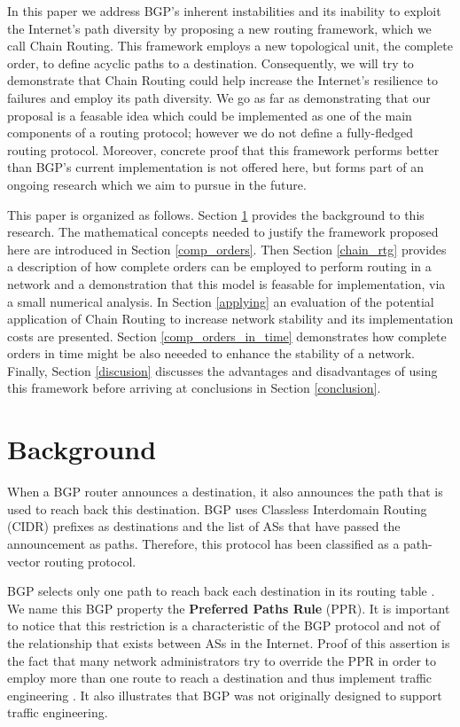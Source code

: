 \documentclass[5p,twocolumn]{elsarticle}
\begin{document}
In this paper we address BGP's inherent instabilities and its inability to exploit the Internet's path diversity by proposing a new routing framework, which we call Chain Routing. This framework employs a new topological unit, the complete order, to define acyclic paths to a destination. Consequently, we will try to demonstrate that Chain Routing could help increase the Internet's resilience to failures and employ its path diversity. We go as far as demonstrating that our proposal is a feasable idea which could be implemented as one of the main components of a routing protocol; however we do not define a fully-fledged routing protocol. Moreover, concrete proof that this framework performs better than BGP's current implementation is not offered here, but forms part of an ongoing research which we aim to pursue in the future.

This paper is organized as follows. Section \ref{background} provides the background to this research. The mathematical concepts needed to justify the framework proposed here are introduced in Section \ref{comp_orders}. Then Section \ref{chain_rtg} provides a description of how complete orders can be employed to perform routing in a network and a demonstration that this model is feasable for implementation, via a small numerical analysis. In Section \ref{applying} an evaluation of the potential application of Chain Routing to increase network stability and its implementation costs are presented. Section \ref{comp_orders_in_time} demonstrates how complete orders in time might be also neeeded to enhance the stability of a network. Finally, Section \ref{discusion} discusses the advantages and disadvantages of using this framework before arriving at conclusions in Section \ref{conclusion}.




\section{Background}\label{background}

When a BGP router announces a destination, it also announces the path that is used to reach back this destination. BGP uses Classless Interdomain Routing (CIDR) prefixes as destinations and the list of ASs that have passed the announcement as paths. Therefore, this protocol has been classified as a path-vector routing protocol.

BGP selects only one path to reach back each destination in its routing table \cite{Rekhter2006}. We name this BGP property the \textbf{Preferred Paths Rule} (PPR). It is important to notice that this restriction is a characteristic of the BGP protocol and not of the relationship that exists between ASs in the Internet. Proof of this assertion is the fact that many network administrators try to override the PPR in order to employ more than one route to reach a destination and thus implement traffic engineering \cite{Caesar2005}. It also illustrates that BGP was not originally designed to support traffic engineering.
\end{document}
